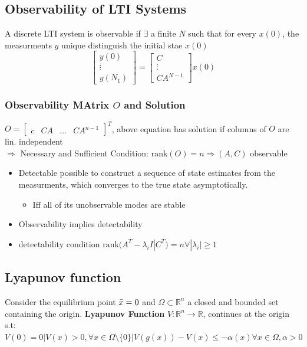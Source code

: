 \subsection{Observability of LTI Systems}
A discrete LTI system is observable if $\exists$ a finite $N$ such that for every $x(0)$, the measurments $y$ unique  distinguish the initial stae $x(0)$
\[\begin{bmatrix}
    y(0) \\\vdots \\y(N_1)
\end{bmatrix}= \begin{bmatrix}
    C \\\vdots \\ CA^{N-1}
\end{bmatrix}x(0)\]
\subsubsection{Observability MAtrix $O$ and Solution}
$O =\begin{bmatrix}
    c & CA & \dotsc & CA^{n-1}
\end{bmatrix}^T$, above equation has solution if columns of $O$ are lin. independent \\
$\Rightarrow$ Necessary and Sufficient Condition: $\textrm{rank}(O) = n \Rightarrow (A,C)$ observable 
\begin{itemize}
    \item Detectable possible to construct a sequence of state estimates from the measurments, which converges to the true state asymptotically. \begin{itemize}
        \item Iff all of its unobservable modes are stable
    \end{itemize} 
    \item Observability implies detectability
    \item detectability condition $\textrm{rank}(A^T-\lambda_iI|C^T) = n \forall |\lambda_i| \geq 1$
\end{itemize}

\subsection{Lyapunov function}
Consider the equilibrium point $\Bar{x}=0$ and $\Omega\subset \mathbb{R}^n$ a closed and bounded set containing the origin. \textbf{Lyapunov Function} $V:\mathbb{R}^n \rightarrow \mathbb{R}$, continues at the origin s.t: $V(0) = 0 |V(x)>0 , \forall x \in \Omega\setminus\{0\}|V(g(x))- V(x)\leq -\alpha(x)\forall x\in \Omega,\alpha > 0$ 
